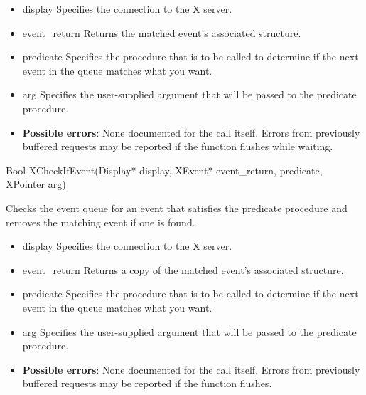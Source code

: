 \documentclass{report}
\begin{document}
\begin{itemize}
        \begin{itemize}
            \item display Specifies the connection to the X server.
            \item event\_return Returns the matched event’s associated structure.
            \item predicate Specifies the procedure that is to be called to determine if the next event in the queue matches what you want.
            \item arg Specifies the user-supplied argument that will be passed to the predicate procedure.
        \end{itemize}

        \begin{itemize}
            \item \textbf{Possible errors}: None documented for the call itself. Errors from previously buffered requests may be reported if the function flushes while waiting.
        \end{itemize}

        \begin{cppcode}
            Bool XCheckIfEvent(Display* display, XEvent* event_return, predicate, XPointer arg)
        \end{cppcode}
        \bigbreak \noindent
        Checks the event queue for an event that satisfies the predicate procedure and removes the matching event if one is found.

        \begin{itemize}
            \item display Specifies the connection to the X server.
            \item event\_return Returns a copy of the matched event’s associated structure.
            \item predicate Specifies the procedure that is to be called to determine if the next event in the queue matches what you want.
            \item arg Specifies the user-supplied argument that will be passed to the predicate procedure.
        \end{itemize}

        \begin{itemize}
            \item \textbf{Possible errors}: None documented for the call itself. Errors from previously buffered requests may be reported if the function flushes.
        \end{itemize}


\end{itemize}
\end{document}
